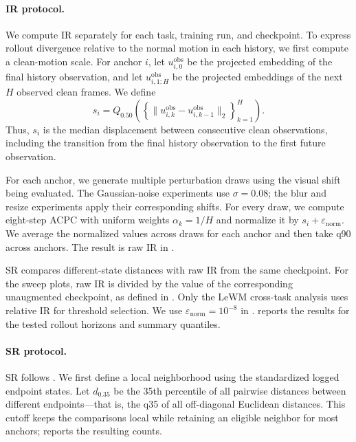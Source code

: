 \documentclass{article}
\begin{document}
\paragraph{IR protocol.}
We compute IR separately for each task, training run, and checkpoint. To
express rollout divergence relative to the normal motion in each history, we
first compute a clean-motion scale. For anchor $i$, let
$u^{\mathrm{obs}}_{i,0}$ be the projected embedding of the final history
observation, and let $u^{\mathrm{obs}}_{i,1:H}$ be the projected embeddings of
the next $H$ observed clean frames. We define
\begin{equation}
s_i
=Q_{0.50}\!\left(
\left\{\|u^{\mathrm{obs}}_{i,k}-u^{\mathrm{obs}}_{i,k-1}\|_2
\right\}_{k=1}^{H}
\right).
\label{eq:clean-transition-scale}
\end{equation}
Thus, $s_i$ is the median displacement between consecutive clean observations,
including the transition from the final history observation to the first
future observation.

For each anchor, we generate multiple perturbation draws using the visual
shift being evaluated. The Gaussian-noise experiments use $\sigma=0.08$; the
blur and resize experiments apply their corresponding shifts. For every draw,
we compute eight-step ACPC with uniform weights $\alpha_k=1/H$ and normalize it
by $s_i+\varepsilon_{\mathrm{norm}}$. We average the normalized values across
draws for each anchor and then take q90 across anchors. The result is raw IR in
.

SR compares different-state distances with raw IR from the same checkpoint.
For the sweep plots, raw IR is divided by the value of the corresponding
unaugmented checkpoint, as defined in . Only the LeWM
cross-task analysis uses relative IR for threshold selection. We use
$\varepsilon_{\mathrm{norm}}=10^{-8}$ in
.
 reports the results for the tested
rollout horizons and summary quantiles.



\paragraph{SR protocol.}
SR follows . We first define a local neighborhood using the
standardized logged endpoint states. Let $d_{0.35}$ be the 35th percentile of
all pairwise distances between different endpoints---that is, the q35 of all off-diagonal Euclidean distances.
This cutoff keeps the comparisons local while retaining an eligible neighbor for most anchors;
 reports the resulting counts.
\end{document}
